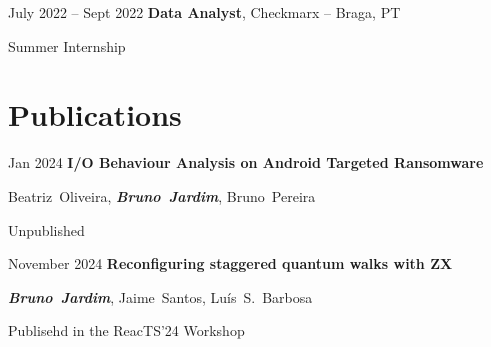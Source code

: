 \documentclass[10pt, letterpaper]{article}
\begin{document}
        \vspace{0.10 cm}
        \vspace{0.2 cm}
            
        \begin{twocolentry}{
            July 2022 – Sept 2022
        }
            \textbf{Data Analyst}, Checkmarx -- Braga, PT\end{twocolentry}
        Summer Internship
        

        

    
    \section{Publications}



        
        \begin{samepage}
            \begin{twocolentry}{
                Jan 2024
            }
                \textbf{I/O Behaviour Analysis on Android Targeted Ransomware}
            \end{twocolentry}

            \vspace{0.10 cm}
            
            \begin{onecolentry}
                \mbox{Beatriz Oliveira}, \mbox{\textbf{\textit{Bruno Jardim}}}, \mbox{Bruno Pereira}

                \vspace{0.10 cm}
            Unpublished
        \end{onecolentry}
        \end{samepage}

        \vspace{0.2 cm}

        \begin{samepage}
            \begin{twocolentry}{
                November 2024
            }
                \textbf{Reconfiguring staggered quantum walks with ZX}
            \end{twocolentry}

            \vspace{0.10 cm}
            
            \begin{onecolentry}
                \mbox{\textbf{\textit{Bruno Jardim}}}, \mbox{Jaime Santos}, \mbox{Luís S. Barbosa}

                \vspace{0.10 cm}
            Publisehd in the ReacTS'24 Workshop
        \end{onecolentry}
        \end{samepage}
\end{document}
